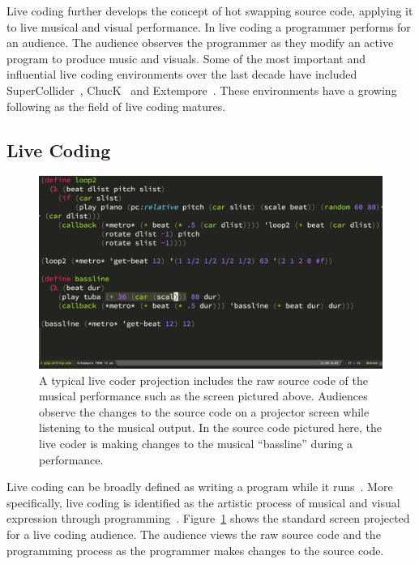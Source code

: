 Live coding further develops the concept of hot swapping source code, applying it to live musical and visual performance. In live coding a programmer performs for an audience. The audience observes the programmer as they modify an active program to produce music and visuals. Some of the most important and influential live coding environments over the last decade have included SuperCollider~\cite{McCartney}, ChucK~\cite{Wang2008} and Extempore~\cite{Sorensen}. These environments have a growing following as the field of live coding matures.

\subsection{Live Coding}

\begin{figure}
\centering
\includegraphics[width=1.0\textwidth]{../images/code/live-coding-screen.png}
\caption[A typical live coder projection]{A typical live coder projection includes the raw source code of the musical performance such as the screen pictured above. Audiences observe the changes to the source code on a projector screen while listening to the musical output. In the source code pictured here, the live coder is making changes to the musical ``bassline'' during a performance.}
\label{fig:live-coding-screen}
\end{figure}


Live coding can be broadly defined as writing a program while it runs~\cite{Ward2004}. More specifically, live coding is identified as the artistic process of musical and visual expression through programming~\cite{Collins2003}. Figure~\ref{fig:live-coding-screen} shows the standard screen projected for a live coding audience. The audience views the raw source code and the programming process as the programmer makes changes to the source code.

